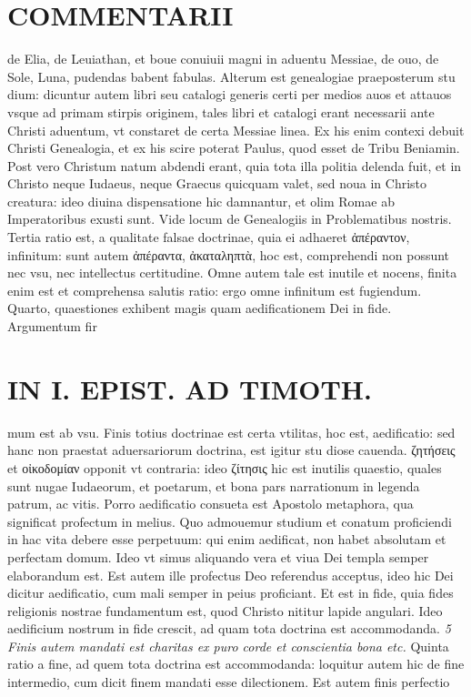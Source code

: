 \documentclass{article}
\begin{document}
\begin{pages}
\section*{COMMENTARII }
\marginpar{[ p.20 ]}\pstart de Elia, de Leuiathan, et boue conuiuii magni in aduentu Messiae, de ouo, de Sole, Luna, pudendas babent fabulas.  \pend\pstart Alterum est genealogiae praeposterum stu dium: dicuntur autem libri seu catalogi generis certi per medios auos et attauos vsque ad primam stirpis originem, tales libri et catalogi erant necessarii ante Christi aduentum, vt constaret de certa Messiae linea. Ex his enim contexi debuit Christi Genealogia, et ex his scire poterat Paulus, quod esset de Tribu Beniamin. Post vero Christum natum abdendi erant, quia tota illa politia delenda fuit, et in Christo neque Iudaeus, neque Graecus quicquam valet, sed noua in Christo creatura: ideo diuina dispensatione hic damnantur, et olim Romae ab Imperatoribus exusti sunt. Vide locum de Genealogiis in Problematibus nostris.  \pend\pstart Tertia ratio est, a qualitate falsae doctrinae, quia ei adhaeret ἀπέραντον, infinitum: sunt autem ἀπέραντα, ἀκαταληπτὰ, hoc est, comprehendi non possunt nec vsu, nec intellectus certitudine. Omne autem tale est inutile et nocens, finita enim est et comprehensa salutis ratio: ergo omne infinitum est fugiendum.  \pend\pstart Quarto, quaestiones exhibent magis quam aedificationem Dei in fide. Argumentum fir\pend
\section*{IN I. EPIST. AD TIMOTH. }
\marginpar{[ p.21 ]}\pstart mum est ab vsu. Finis totius doctrinae est certa vtilitas, hoc est, aedificatio: sed hanc non praestat aduersariorum doctrina, est igitur stu diose cauenda. ζητήσεις et οἰκοδομίαν opponit vt contraria: ideo ζίτησις hic est inutilis quaestio, quales sunt nugae Iudaeorum, et poetarum, et bona pars narrationum in legenda patrum, ac vitis. Porro aedificatio consueta est Apostolo metaphora, qua significat profectum in melius. Quo admouemur studium et conatum proficiendi in hac vita debere esse perpetuum: qui enim aedificat, non habet absolutam et perfectam domum. Ideo vt simus aliquando vera et viua Dei templa semper elaborandum est.  \pend\pstart Est autem ille profectus Deo referendus acceptus, ideo hic Dei dicitur aedificatio, cum mali semper in peius proficiant. Et est in fide, quia fides religionis nostrae fundamentum est, quod Christo nititur lapide angulari. Ideo aedificium nostrum in fide crescit, ad quam tota doctrina est accommodanda.  \pend
\textit{5 Finis autem mandati est charitas ex puro corde et conscientia bona etc. }\pstart Quinta ratio a fine, ad quem tota doctrina est accommodanda: loquitur autem hic de fine intermedio, cum dicit finem mandati esse dilectionem. Est autem finis perfectio  \pend

\end{pages}
\end{document}
